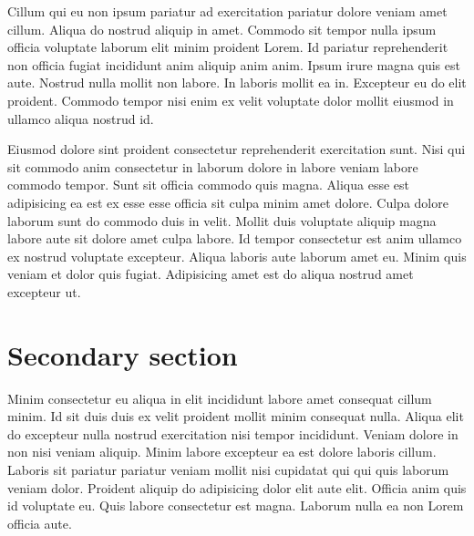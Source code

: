 \documentclass[
12pt,
openright,
oneside,
a4paper,
chapter=TITLE,
section=TITLE,
french,
spanish,
brazil,
english
]{abntex2}\usepackage{array}
\renewcommand{\baselinestretch}{1.5}
\renewcommand{\tocprintchapternonum}{
  \addtocontents{toc}{\setlength{\cftchapterindent}{5.65em}}
  \addtocontents{toc}{\setlength{\cftchapternumwidth}{0em}}
}
\newcommand{\tocskipone}{
  \addtocontents{toc}{\protect\vspace{\smallskipamount}}
}
\newcommand{\newbibname}{REFERENCES}
\theoremstyle{plain}
\theoremstyle{remark}
\begin{document}
Cillum qui eu non ipsum pariatur ad exercitation pariatur dolore veniam
amet cillum. Aliqua do nostrud aliquip in amet. Commodo sit tempor nulla
ipsum officia voluptate laborum elit minim proident Lorem. Id pariatur
reprehenderit non officia fugiat incididunt anim aliquip anim anim.
Ipsum irure magna quis est aute. Nostrud nulla mollit non labore. In
laboris mollit ea in. Excepteur eu do elit proident. Commodo tempor nisi
enim ex velit voluptate dolor mollit eiusmod in ullamco aliqua nostrud
id.

Eiusmod dolore sint proident consectetur reprehenderit exercitation
sunt. Nisi qui sit commodo anim consectetur in laborum dolore in labore
veniam labore commodo tempor. Sunt sit officia commodo quis magna.
Aliqua esse est adipisicing ea est ex esse esse officia sit culpa minim
amet dolore. Culpa dolore laborum sunt do commodo duis in velit. Mollit
duis voluptate aliquip magna labore aute sit dolore amet culpa labore.
Id tempor consectetur est anim ullamco ex nostrud voluptate excepteur.
Aliqua laboris aute laborum amet eu. Minim quis veniam et dolor quis
fugiat. Adipisicing amet est do aliqua nostrud amet excepteur ut.

\section{Secondary section}\label{secondary-section-2}

Minim consectetur eu aliqua in elit incididunt labore amet consequat
cillum minim. Id sit duis duis ex velit proident mollit minim consequat
nulla. Aliqua elit do excepteur nulla nostrud exercitation nisi tempor
incididunt. Veniam dolore in non nisi veniam aliquip. Minim labore
excepteur ea est dolore laboris cillum. Laboris sit pariatur pariatur
veniam mollit nisi cupidatat qui qui quis laborum veniam dolor. Proident
aliquip do adipisicing dolor elit aute elit. Officia anim quis id
voluptate eu. Quis labore consectetur est magna. Laborum nulla ea non
Lorem officia aute.

\postextual

\begingroup
\renewcommand{\baselinestretch}{1}
\setcounter{footnote}{0}
\renewcommand{\thefootnote}{\fnsymbol{footnote}}
\printbibliography[heading=bibheading]
\endgroup

\tocskipone
\tocprintchapternonum
\addcontentsline{toc}{chapter}{\newbibname}
\end{document}
